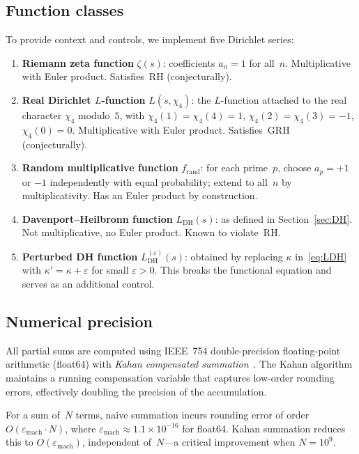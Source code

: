 \documentclass[11pt]{amsart}
\theoremstyle{definition}
\theoremstyle{remark}
\renewcommand{\DH}{\mathrm{DH}}
\begin{document}
\subsection{Function classes}

To provide context and controls, we implement five Dirichlet series:

\begin{enumerate}
\item \textbf{Riemann zeta function} $\zeta(s)$: coefficients
  $a_n = 1$ for all~$n$.  Multiplicative with Euler product.  Satisfies~RH
  (conjecturally).

\item \textbf{Real Dirichlet $L$-function} $L(s, \chi_4)$: the
  $L$-function attached to the real character $\chi_4$ modulo~$5$,
  with $\chi_4(1) = \chi_4(4) = 1$, $\chi_4(2) = \chi_4(3) = -1$,
  $\chi_4(0) = 0$.  Multiplicative with Euler product.  Satisfies~GRH
  (conjecturally).

\item \textbf{Random multiplicative function} $f_{\mathrm{rand}}$:
  for each prime~$p$, choose $a_p = +1$ or $-1$ independently with
  equal probability; extend to all~$n$ by multiplicativity.  Has an
  Euler product by construction.

\item \textbf{Davenport--Heilbronn function} $L_{\DH}(s)$: as defined
  in Section~\ref{sec:DH}.  Not multiplicative, no Euler product.
  Known to violate~RH.

\item \textbf{Perturbed DH function} $L_{\DH}^{(\varepsilon)}(s)$:
  obtained by replacing $\kappa$ in~\eqref{eq:LDH} with
  $\kappa' = \kappa + \varepsilon$ for small
  $\varepsilon > 0$.  This breaks the functional equation and serves
  as an additional control.
\end{enumerate}

\subsection{Numerical precision}\label{ssec:precision}

All partial sums are computed using IEEE~754 double-precision
floating-point arithmetic (float64) with \emph{Kahan compensated
summation}~\cite{Kahan1965}.  The Kahan algorithm maintains a running
compensation variable that captures low-order rounding errors,
effectively doubling the precision of the accumulation.

For a sum of~$N$ terms, naive summation incurs rounding error of
order $O(\varepsilon_{\mathrm{mach}} \cdot N)$, where
$\varepsilon_{\mathrm{mach}} \approx 1.1 \times 10^{-16}$ for
float64.  Kahan summation reduces this to
$O(\varepsilon_{\mathrm{mach}})$, independent of~$N$---a critical
improvement when $N = 10^9$.
\end{document}
